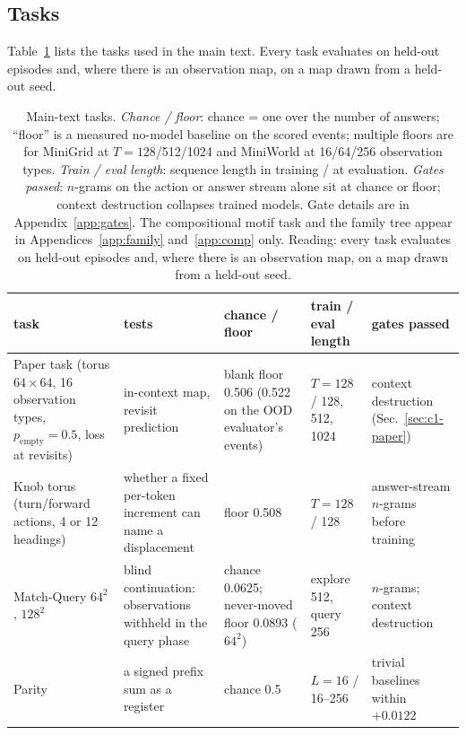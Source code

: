 \documentclass[10pt]{article}
\begin{document}
\subsection{Tasks}
\label{sec:tasks}

Table~\ref{tab:tasks} lists the tasks used in the main text. Every task evaluates on held-out
episodes and, where there is an observation map, on a map drawn from a held-out seed.

\begin{table}[t]
\centering
\small
\captionsetup{font=footnotesize,skip=4pt}
\caption{Main-text tasks. \emph{Chance / floor}: chance = one over the number of answers; ``floor'' is a measured no-model baseline on the scored events; multiple floors are for MiniGrid at $T=128$/512/1024 and MiniWorld at 16/64/256 observation types. \emph{Train / eval length}: sequence length in training / at evaluation. \emph{Gates passed}: $n$-grams on the action or answer stream alone sit at chance or floor; context destruction collapses trained models. Gate details are in Appendix~\ref{app:gates}. The compositional motif task and the family tree appear in Appendices~\ref{app:family} and~\ref{app:comp} only. Reading: every task evaluates on held-out episodes and, where there is an observation map, on a map drawn from a held-out seed.}
\label{tab:tasks}
\begin{tabular}{@{}>{\raggedright\arraybackslash}p{2.7cm}>{\raggedright\arraybackslash}p{3.7cm}>{\raggedright\arraybackslash}p{2.9cm}>{\raggedright\arraybackslash}p{2.1cm}>{\raggedright\arraybackslash}p{2.6cm}@{}}
\toprule
task & tests & chance / floor & train / eval length & gates passed \\
\midrule
Paper task (torus $64\times64$, 16 observation types, $p_{\mathrm{empty}}=0.5$, loss at revisits) & in-context map, revisit prediction & blank floor 0.506 (0.522 on the OOD evaluator's events) & $T=128$ / 128, 512, 1024 & context destruction (Sec.~\ref{sec:c1-paper}) \\
Knob torus (turn/forward actions, 4 or 12 headings) & whether a fixed per-token increment can name a displacement & floor 0.508 & $T=128$ / 128 & answer-stream $n$-grams before training \\
Match-Query $64^2$, $128^2$ & blind continuation: observations withheld in the query phase & chance 0.0625; never-moved floor 0.0893 ($64^2$) & explore 512, query 256 & $n$-grams; context destruction \\
Parity & a signed prefix sum as a register & chance 0.5 & $L=16$ / 16--256 & trivial baselines within $+0.0122$ \\

\end{tabular}
\end{table}
\end{document}
